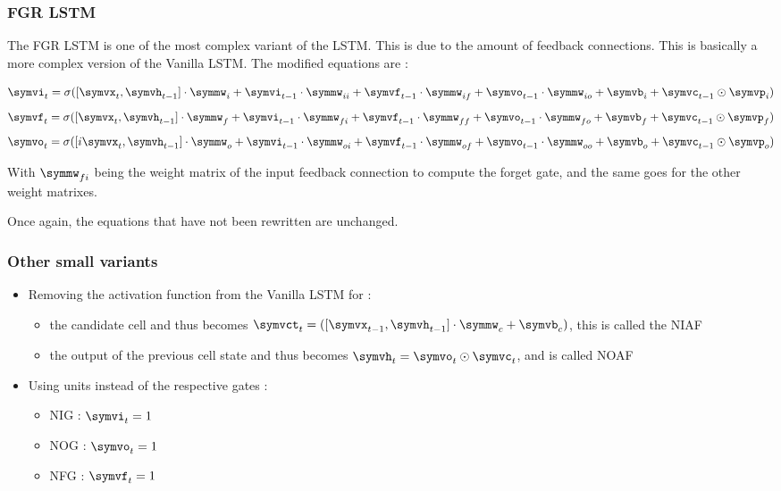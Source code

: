 \subsubsection{\acl{FGR} \ac{LSTM}}
The \ac{FGR} \ac{LSTM} is one of the most complex variant of the \ac{LSTM}. This is due to the amount of feedback connections. This is basically a more complex version of the Vanilla \ac{LSTM}. The modified equations are :

\begin{equation}\label{eq:inputGFGR}
  \symvi_t=\sigma ([\symvx_{t},\symvh_{t-1}]\cdot \symmw_i  + \symvi_{t-1}\cdot \symmw_{ii} + \symvf_{t-1}\cdot \symmw_{if} + \symvo_{t-1}\cdot \symmw_{io} + \symvb_i +\symvc_{t-1}\odot \symvp_i)
\end{equation}
\begin{equation}\label{eq:forgetGFGR}
  \symvf_t=\sigma ([\symvx_{t},\symvh_{t-1}]\cdot \symmw_f  + \symvi_{t-1}\cdot \symmw_{fi} + \symvf_{t-1}\cdot \symmw_{ff} + \symvo_{t-1}\cdot \symmw_{fo} + \symvb_f +\symvc_{t-1}\odot \symvp_f)
\end{equation}
\begin{equation}\label{eq:ouputGFGR}
  \symvo_t=\sigma ([i\symvx_{t},\symvh_{t-1}]\cdot \symmw_o + \symvi_{t-1}\cdot \symmw_{oi} + \symvf_{t-1}\cdot \symmw_{of} + \symvo_{t-1}\cdot \symmw_{oo} + \symvb_o +\symvc_{t-1}\odot \symvp_o)
\end{equation}

With $\symmw_{fi}$ being the weight matrix of the input feedback connection to compute the forget gate, and the same goes for the other weight matrixes.

Once again, the equations that have not been rewritten are unchanged.

\subsubsection{Other small variants}

\begin{itemize}
  \item Removing the activation function from the Vanilla \ac{LSTM} for :
    \begin{itemize}
      \item the candidate cell and thus becomes $ \symvct_t=([\symvx_{t-1},\symvh_{t-1}]\cdot\symmw_c + \symvb_c) $, this is called the \ac{NIAF}
      \item the output of the previous cell state and thus becomes $ \symvh_t=\symvo_t\odot \symvc_t $, and is called \ac{NOAF}
    \end{itemize}
  \item Using units instead of the respective gates :
    \begin{itemize}
      \item \ac{NIG} : $\symvi_t=1$
      \item \ac{NOG} : $\symvo_t=1$
      \item \ac{NFG} : $\symvf_t=1$
    \end{itemize}
\end{itemize}
